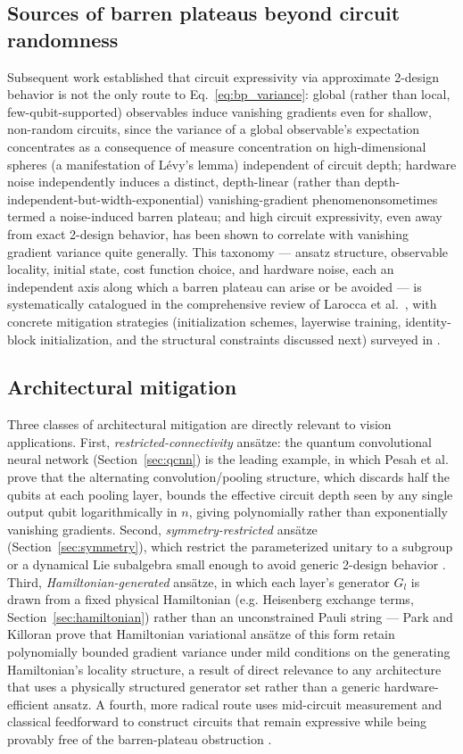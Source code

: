 \documentclass[11pt]{article}
\begin{document}
\subsection{Sources of barren plateaus beyond circuit randomness}
Subsequent work established that circuit expressivity via approximate 2-design behavior is not the only route to Eq.~\eqref{eq:bp_variance}: global (rather than local, few-qubit-supported) observables induce vanishing gradients even for shallow, non-random circuits, since the variance of a global observable's expectation concentrates as a consequence of measure concentration on high-dimensional spheres (a manifestation of L\'evy's lemma) independent of circuit depth; hardware noise independently induces a distinct, depth-linear (rather than depth-independent-but-width-exponential) vanishing-gradient phenomenonsometimes termed a noise-induced barren plateau; and high circuit expressivity, even away from exact 2-design behavior, has been shown to correlate with vanishing gradient variance quite generally. This taxonomy — ansatz structure, observable locality, initial state, cost function choice, and hardware noise, each an independent axis along which a barren plateau can arise or be avoided — is systematically catalogued in the comprehensive review of Larocca et al.\ \cite{Larocca2025}, with concrete mitigation strategies (initialization schemes, layerwise training, identity-block initialization, and the structural constraints discussed next) surveyed in \cite{Cunningham2024}.

\subsection{Architectural mitigation}
Three classes of architectural mitigation are directly relevant to vision applications. First, \emph{restricted-connectivity} ansätze: the quantum convolutional neural network (Section~\ref{sec:qcnn}) is the leading example, in which Pesah et al.\ \cite{Pesah2021} prove that the alternating convolution/pooling structure, which discards half the qubits at each pooling layer, bounds the effective circuit depth seen by any single output qubit logarithmically in $n$, giving polynomially rather than exponentially vanishing gradients. Second, \emph{symmetry-restricted} ansätze (Section~\ref{sec:symmetry}), which restrict the parameterized unitary to a subgroup or a dynamical Lie subalgebra small enough to avoid generic 2-design behavior \cite{West2024,Nguyen2024EQNN,Schatzki2024}. Third, \emph{Hamiltonian-generated} ansätze, in which each layer's generator $G_l$ is drawn from a fixed physical Hamiltonian (e.g. Heisenberg exchange terms, Section~\ref{sec:hamiltonian}) rather than an unconstrained Pauli string — Park and Killoran \cite{Park2024} prove that Hamiltonian variational ansätze of this form retain polynomially bounded gradient variance under mild conditions on the generating Hamiltonian's locality structure, a result of direct relevance to any architecture that uses a physically structured generator set rather than a generic hardware-efficient ansatz. A fourth, more radical route uses mid-circuit measurement and classical feedforward to construct circuits that remain expressive while being provably free of the barren-plateau obstruction \cite{Deshpande2024}.
\end{document}
